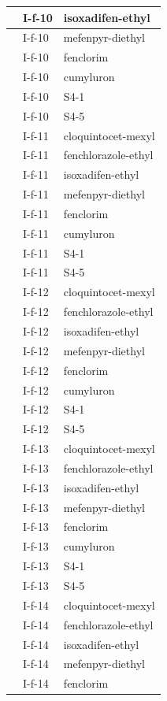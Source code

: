 \documentclass[11pt,a4paper]{article}
\begin{document}
\begin{table}[h]
\begin{tabular}{|l|l|l|}
 & I-f-10 & isoxadifen-ethyl \\ \hline
 & I-f-10 & mefenpyr-diethyl \\ \hline
 & I-f-10 & fenclorim \\ \hline
 & I-f-10 & cumyluron \\ \hline
 & I-f-10 & S4-1 \\ \hline
 & I-f-10 & S4-5 \\ \hline
 & I-f-11 & cloquintocet-mexyl \\ \hline
 & I-f-11 & fenchlorazole-ethyl \\ \hline
 & I-f-11 & isoxadifen-ethyl \\ \hline
 & I-f-11 & mefenpyr-diethyl \\ \hline
 & I-f-11 & fenclorim \\ \hline
 & I-f-11 & cumyluron \\ \hline
 & I-f-11 & S4-1 \\ \hline
 & I-f-11 & S4-5 \\ \hline
 & I-f-12 & cloquintocet-mexyl \\ \hline
 & I-f-12 & fenchlorazole-ethyl \\ \hline
 & I-f-12 & isoxadifen-ethyl \\ \hline
 & I-f-12 & mefenpyr-diethyl \\ \hline
 & I-f-12 & fenclorim \\ \hline
 & I-f-12 & cumyluron \\ \hline
 & I-f-12 & S4-1 \\ \hline
 & I-f-12 & S4-5 \\ \hline
 & I-f-13 & cloquintocet-mexyl \\ \hline
 & I-f-13 & fenchlorazole-ethyl \\ \hline
 & I-f-13 & isoxadifen-ethyl \\ \hline
 & I-f-13 & mefenpyr-diethyl \\ \hline
 & I-f-13 & fenclorim \\ \hline
 & I-f-13 & cumyluron \\ \hline
 & I-f-13 & S4-1 \\ \hline
 & I-f-13 & S4-5 \\ \hline
 & I-f-14 & cloquintocet-mexyl \\ \hline
 & I-f-14 & fenchlorazole-ethyl \\ \hline
 & I-f-14 & isoxadifen-ethyl \\ \hline
 & I-f-14 & mefenpyr-diethyl \\ \hline
 & I-f-14 & fenclorim \\ \hline

\end{tabular}
\end{table}
\end{document}
